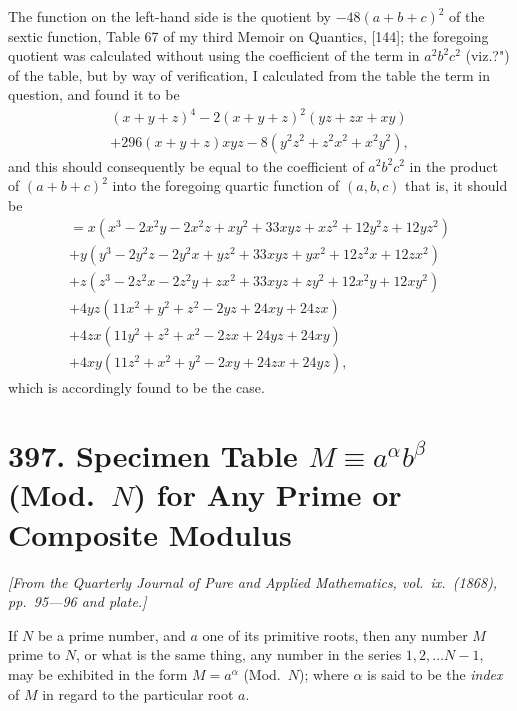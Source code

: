 \documentclass[11pt,a4paper]{article}
\theoremstyle{definition}
\begin{document}
The function on the left-hand side is the quotient by $-48(a+b+c)^2$ of the sextic function, Table 67 of my third Memoir on Quantics, [144]; the foregoing quotient was calculated without using the coefficient of the term in $a^2b^2c^2$ (viz.?") of the table, but by way of verification, I calculated from the table the term in question, and found it to be
\begin{multline*}
(x+y+z)^4 - 2(x+y+z)^2(yz+zx+xy) \\
+ 296(x+y+z)xyz - 8(y^2z^2+z^2x^2+x^2y^2),
\end{multline*}
and this should consequently be equal to the coefficient of $a^2b^2c^2$ in the product of $(a+b+c)^2$ into the foregoing quartic function of $(a,b,c)$ that is, it should be
\begin{multline*}
= x(x^3-2x^2y-2x^2z+xy^2+33xyz+xz^2+12y^2z+12yz^2) \\
+ y(y^3-2y^2z-2y^2x+yz^2+33xyz+yx^2+12z^2x+12zx^2) \\
+ z(z^3-2z^2x-2z^2y+zx^2+33xyz+zy^2+12x^2y+12xy^2) \\
+ 4yz(11x^2+y^2+z^2-2yz+24xy+24zx) \\
+ 4zx(11y^2+z^2+x^2-2zx+24yz+24xy) \\
+ 4xy(11z^2+x^2+y^2-2xy+24zx+24yz),
\end{multline*}
which is accordingly found to be the case.

\newpage


\section*{397. Specimen Table $M \equiv a^\alpha b^\beta$ (Mod.\ $N$) for Any Prime or Composite Modulus}

\begin{flushright}
\textit{[From the Quarterly Journal of Pure and Applied Mathematics, vol.\ ix.\ (1868), pp.~95---96 and plate.]}
\end{flushright}

\vspace{0.5em}

If $N$ be a prime number, and $a$ one of its primitive roots, then any number $M$ prime to $N$, or what is the same thing, any number in the series $1, 2, \dots N-1$, may be exhibited in the form $M = a^\alpha$ (Mod.\ $N$); where $\alpha$ is said to be the \textit{index} of $M$ in regard to the particular root $a$.
\end{document}
